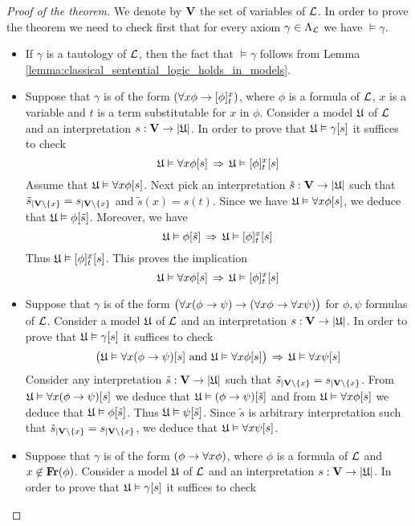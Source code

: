 \begin{proof}[Proof of the theorem]
We denote by $\mathbf{V}$ the set of variables of ${\mathcal L}$. In order to prove the theorem we need to check first that for every axiom $\gamma \in \Lambda_{{\mathcal L}}$ we have $\vDash \gamma$.
\begin{itemize}
\item If $\gamma$ is a tautology of ${\mathcal L}$, then the fact that $\vDash \gamma$ follows from Lemma \ref{lemma:classical_sentential_logic_holds_in_models}.
\item Suppose that $\gamma$ is of the form $\left(\forall x\phi \rightarrow [\phi]^x_t\right)$, where $\phi$ is a formula of ${\mathcal L}$, $x$ is a variable and $t$ is a term substitutable for $x$ in $\phi$. Consider a model ${\mathfrak U}$ of ${\mathcal L}$ and an interpretation $s:\mathbf{V} \rightarrow |{\mathfrak U}|$. In order to prove that ${\mathfrak U} \vDash \gamma[s]$ it suffices to check
$${\mathfrak U} \vDash \forall x\phi[s] \,\Rightarrow\,  {\mathfrak U} \vDash [\phi]^x_t[s]$$
Assume that ${\mathfrak U} \vDash \forall x\phi[s]$. Next pick an interpretation $\tilde{s}: \mathbf{V} \rightarrow |{\mathfrak U}|$ such that $\tilde{s}_{\mid \mathbf{V}\setminus \{x\}} =s_{\mid \mathbf{V}\setminus \{x\}}$ and $\tilde{s}(x) = s(t)$. Since we have ${\mathfrak U} \vDash \forall x\phi[s]$, we deduce that ${\mathfrak U} \vDash \phi[\tilde{s}]$. Moreover, we have
$${\mathfrak U} \vDash \phi[\tilde{s}] \,\Rightarrow\,{\mathfrak U} \vDash [\phi]^x_t[s]$$
Thus ${\mathfrak U} \vDash [\phi]^x_t[s]$. This proves the implication
$${\mathfrak U} \vDash \forall x\phi[s] \,\Rightarrow\, {\mathfrak U} \vDash [\phi]^x_t[s]$$
\item Suppose that $\gamma$ is of the form $\big(\forall x (\phi \rightarrow \psi) \rightarrow (\forall x\phi \rightarrow \forall x\psi)\big)$ for $\phi, \psi$ formulas of ${\mathcal L}$. Consider a model ${\mathfrak U}$ of ${\mathcal L}$ and an interpretation $s:\mathbf{V} \rightarrow |{\mathfrak U}|$. In order to prove that ${\mathfrak U} \vDash \gamma[s]$ it suffices to check
$$\big({\mathfrak U} \vDash \forall x (\phi \rightarrow \psi) [s]\mbox{ and }{\mathfrak U} \vDash \forall x\phi[s]\big) \,\Rightarrow\, {\mathfrak U} \vDash \forall x\psi[s]$$
Consider any interpretation $\tilde{s}:\mathbf{V} \rightarrow |{\mathfrak U}|$ such that $\tilde{s}_{\mid \mathbf{V}\setminus \{x\}} = s_{\mid \mathbf{V}\setminus \{x\}}$. From ${\mathfrak U} \vDash \forall x (\phi \rightarrow \psi) [s]$ we deduce that ${\mathfrak U} \vDash (\phi \rightarrow \psi) [\tilde{s}]$ and from ${\mathfrak U} \vDash \forall x\phi[s]$ we deduce that ${\mathfrak U} \vDash \phi[\tilde{s}]$. Thus ${\mathfrak U} \vDash \psi[\tilde{s}]$. Since $\tilde{s}$ is arbitrary interpretation such that $\tilde{s}_{\mid \mathbf{V}\setminus \{x\}} = s_{\mid \mathbf{V}\setminus \{x\}}$, we deduce that ${\mathfrak U} \vDash \forall x\psi[s]$.
\item Suppose that $\gamma$ is of the form $\left(\phi \rightarrow \forall x\phi\right)$, where $\phi$ is a formula of ${\mathcal L}$ and $x \not \in \mathbf{Fr}(\phi)$. Consider a model ${\mathfrak U}$ of ${\mathcal L}$ and an interpretation $s:\mathbf{V} \rightarrow |{\mathfrak U}|$. In order to prove that ${\mathfrak U} \vDash \gamma[s]$ it suffices to check

\end{itemize}
\end{proof}
